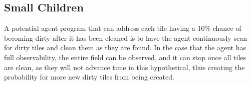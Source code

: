 \documentclass{article}
\begin{document}
\subsection*{Small Children}

A potential agent program that can address each tile having a 10\% chance of becoming dirty after it has been cleaned is to have the agent continuously scan for dirty tiles and clean them as they are found. In the case that the agent has full observability, the entire field can be observed, and it can stop once all tiles are clean, as they will not advance time in this hypothetical, thus creating the probability for more new dirty tiles from being created.
\end{document}
